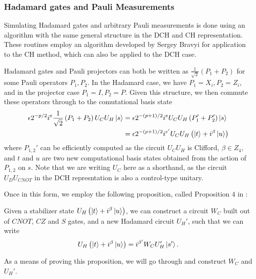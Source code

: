 \subsubsection*{Hadamard gates and Pauli Measurements}
Simulating Hadamard gates and arbitrary Pauli measurements is done using an algorithm with the same general structure in the DCH and CH representation. These routines employ an algorithm developed by Sergey Bravyi for application to the CH method,  which can also be applied to the DCH case.\par
Hadamard gates and Pauli projectors can both be written as $\frac{1}{\sqrt{2}}\left(P_{1}+P_{2}\right)$ for some Pauli operators $P_{1},P_{2}$. In the Hadamard case, we have $P_{1}=X_{i},P_{2}=Z_{i}$, and in the projector case $P_{1}=I,P_{2}=P$. Given this structure, we then commute these operators through to the comutational basis state
\begin{align*}
\epsilon 2^{-p/2}i^{e}\frac{1}{\sqrt{2}}\left(P_{1}+P_{2}\right)U_{C}U_{H}\ket{s} &=
\epsilon 2^{-(p+1)/2}i^{e} U_{C}U_{H}\left(P_{1}'+P_{2}'\right)\ket{s} \\ 
&= \epsilon 2^{-(p+1)/2}i^{e'} U_{C}U_{H}\left(\ket{t}+i^{\beta}\ket{u}\right)
\end{align*}
where $P_{1,2}'$ can be efficiently computed as the circuit $U_{C}U_{H}$ is Clifford, $\beta\in\mathbb{}Z_{4}$, and $t$ and $u$ are two new computational basis states obtained from the action of $P_{1,2}$ on $s$. Note that we are writing $U_{C}$ here as a shorthand, as the circuit $U_{D}U_{CNOT}$ in the DCH represntation is also a control-type unitary.\par
Once in this form, we employ the following proposition, called Proposition $4$ in \cite{Bravyi2018}:
\begin{prop}
\label{prop:pseudocz}
Given a stabilizer state $U_{H}\left(\ket{t}+i^{\beta}\ket{u}\right)$, we can construct a circuit $W_{C}$ built out of $CNOT$, $CZ$ and $S$ gates, and a new Hadamard circuit $U_{H}'$, such that we can write
\[U_{H}\left(\ket{t}+i^{\beta}\ket{u}\right) = i^{\beta'}W_{C}U_{H}'\ket{s'}.\]
\end{prop}
As a means of proving this proposition, we will go through and construct $W_{C}$ and $U_{H}'$.
